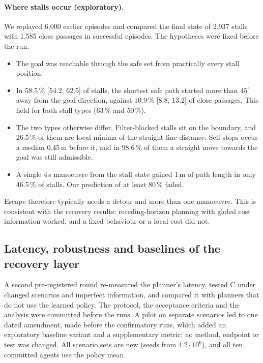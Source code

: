 \documentclass[11pt]{article}
\theoremstyle{definition}
\theoremstyle{remark}
\begin{document}
\paragraph{Where stalls occur (exploratory).} We replayed 6{,}000 earlier episodes and compared the final state of 2{,}937 stalls with 1{,}585 close passages in successful episodes. The hypotheses were fixed before the run.
\begin{itemize}
  \item The goal was reachable through the safe set from practically every stall position.
  \item In 58.5\,\% [54.2, 62.5] of stalls, the shortest safe path started more than $45^\circ$ away from the goal direction, against 10.9\,\% [8.8, 13.2] of close passages. This held for both stall types (63\,\% and 50\,\%).
  \item The two types otherwise differ. Filter-blocked stalls sit on the boundary, and 26.5\,\% of them are local minima of the straight-line distance. Self-stops occur a median 0.45\,m before it, and in 98.6\,\% of them a straight move towards the goal was still admissible.
  \item A single 4\,s manoeuvre from the stall state gained 1\,m of path length in only 46.5\,\% of stalls. Our prediction of at least 80\,\% failed.
\end{itemize}
Escape therefore typically needs a detour and more than one manoeuvre. This is consistent with the recovery results: receding-horizon planning with global cost information worked, and a fixed behaviour or a local cost did not.

\subsection{Latency, robustness and baselines of the recovery layer}\label{sec:r4}
A second pre-registered round re-measured the planner's latency, tested C under changed scenarios and imperfect information, and compared it with planners that do not use the learned policy. The protocol, the acceptance criteria and the analysis were committed before the runs. A pilot on separate scenarios led to one dated amendment, made before the confirmatory runs, which added an exploratory baseline variant and a supplementary metric; no method, endpoint or test was changed. All scenario sets are new (seeds from $4.2\cdot10^6$), and all ten committed agents use the policy mean.
\end{document}
